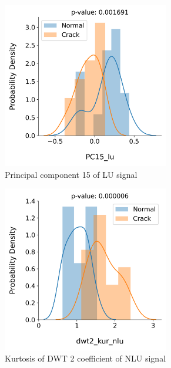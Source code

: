 \begin{figure}[tb]
  \begin{subfigure}[t]{0.49\linewidth}
    \centering
    \includegraphics[width=0.8\textwidth]{fig/crack_detection_PC15_lu.png}
    \caption{Principal component 15 of LU signal}
  \end{subfigure}
  \begin{subfigure}[t]{0.49\linewidth}
    \centering
    \includegraphics[width=0.8\textwidth]{fig/crack_detection_dwt2_kur_nlu.png}
    \caption{Kurtosis of DWT 2 coefficient of NLU signal}
  \end{subfigure}
  \begin{subfigure}[t]{0.49\linewidth}

\end{subfigure}
\end{figure}
